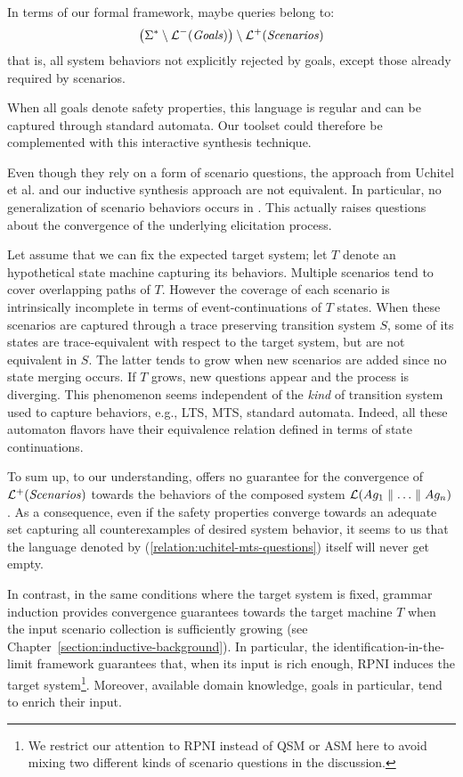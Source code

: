 In terms of our formal framework, maybe queries belong to:
\begin{align}
\left( \Sigma^* \setminus \mathcal{L}^-(\mbox{\emph{Goals}}) \right) \setminus \mathcal{L}^+(\mbox{\emph{Scenarios}})
\label{relation:uchitel-mts-questions}
\end{align}
that is, all system behaviors not explicitly rejected by goals, except those already required by scenarios.

When all goals denote safety properties, this language is regular and can be captured through standard automata. Our toolset could therefore be complemented with this interactive synthesis technique.

Even though they rely on a form of scenario questions, the approach from Uchitel et al. and our inductive synthesis approach are not equivalent. In particular, no generalization of scenario behaviors occurs in \cite{Uchitel:2007, Uchitel:2009}. This actually raises questions about the convergence of the underlying elicitation process. 

Let assume that we can fix the expected target system; let $T$ denote an hypothetical state machine capturing its behaviors. Multiple scenarios tend to cover overlapping paths of $T$. However the coverage of each scenario is intrinsically incomplete in terms of event-continuations of $T$ states. When these scenarios are captured through a trace preserving transition system $S$, some of its states are trace-equivalent with respect to the target system, but are not equivalent in $S$. The latter tends to grow when new scenarios are added since no state merging occurs. If $T$ grows, new questions appear and the process is diverging. This phenomenon seems independent of the \emph{kind} of transition system used to capture behaviors, e.g., LTS, MTS, standard automata. Indeed, all these automaton flavors have their equivalence relation defined in terms of state continuations.

To sum up, to our understanding, \cite{Uchitel:2009} offers no guarantee for the convergence of $\mathcal{L}^+(\mbox{\emph{Scenarios}})$ towards the behaviors of the composed system $\mathcal{L}(Ag_1 \parallel \ldots \parallel Ag_n)$. As a consequence, even if the safety properties converge towards an adequate set capturing all counterexamples of desired system behavior, it seems to us that the language denoted by (\ref{relation:uchitel-mts-questions}) itself will never get empty. 

In contrast, in the same conditions where the target system is fixed, grammar induction provides convergence guarantees towards the target machine $T$ when the input scenario collection is sufficiently growing \cite{Oncina:1993} (see Chapter~\ref{section:inductive-background}). In particular, the identification-in-the-limit framework guarantees that, when its input is rich enough, RPNI induces the target system\footnote{We restrict our attention to RPNI instead of QSM or ASM here to avoid mixing two different kinds of scenario questions in the discussion.}. Moreover, available domain knowledge, goals in particular, tend to enrich their input.

